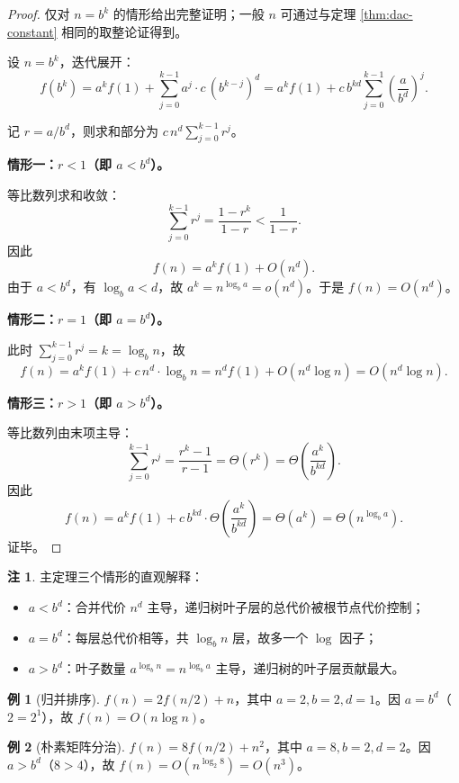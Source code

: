 \documentclass[UTF8,11pt,a4paper]{ctexbook}   %
\theoremstyle{definition}
\newtheorem{example}{例}[section]
\newtheorem{remark}{注}[section]
\begin{document}
\begin{proof}
仅对 $n=b^k$ 的情形给出完整证明；一般 $n$ 可通过与定理 \ref{thm:dac-constant} 相同的取整论证得到。

设 $n=b^k$，迭代展开：
\[
f(b^k) = a^k f(1) + \sum_{j=0}^{k-1} a^j \cdot c\,(b^{k-j})^d
= a^k f(1) + c\,b^{kd}\sum_{j=0}^{k-1}\left(\frac{a}{b^d}\right)^j.
\]

记 $r = a/b^d$，则求和部分为 $c\,n^d \sum_{j=0}^{k-1} r^j$。

\textbf{情形一：$r < 1$（即 $a < b^d$）。}

等比数列求和收敛：
\[
\sum_{j=0}^{k-1} r^j = \frac{1-r^k}{1-r} < \frac{1}{1-r}.
\]
因此
\[
f(n) = a^k f(1) + O(n^d).
\]
由于 $a < b^d$，有 $\log_b a < d$，故 $a^k = n^{\log_b a} = o(n^d)$。于是 $f(n) = O(n^d)$。

\textbf{情形二：$r = 1$（即 $a = b^d$）。}

此时 $\sum_{j=0}^{k-1} r^j = k = \log_b n$，故
\[
f(n) = a^k f(1) + c\,n^d\cdot\log_b n = n^d f(1) + O(n^d\log n) = O(n^d\log n).
\]

\textbf{情形三：$r > 1$（即 $a > b^d$）。}

等比数列由末项主导：
\[
\sum_{j=0}^{k-1} r^j = \frac{r^k - 1}{r-1} = \Theta(r^k) = \Theta\left(\frac{a^k}{b^{kd}}\right).
\]
因此
\[
f(n) = a^k f(1) + c\,b^{kd}\cdot\Theta\left(\frac{a^k}{b^{kd}}\right) = \Theta(a^k) = \Theta(n^{\log_b a}).
\]
证毕。
\end{proof}

\begin{remark}
主定理三个情形的直观解释：
\begin{itemize}
    \item $a < b^d$：合并代价 $n^d$ 主导，递归树叶子层的总代价被根节点代价控制；
    \item $a = b^d$：每层总代价相等，共 $\log_b n$ 层，故多一个 $\log$ 因子；
    \item $a > b^d$：叶子数量 $a^{\log_b n} = n^{\log_b a}$ 主导，递归树的叶子层贡献最大。
\end{itemize}
\end{remark}

\begin{example}[归并排序]
$f(n) = 2f(n/2) + n$，其中 $a=2,b=2,d=1$。因 $a=b^d$（$2=2^1$），故 $f(n) = O(n\log n)$。
\end{example}

\begin{example}[朴素矩阵分治]
$f(n) = 8f(n/2) + n^2$，其中 $a=8,b=2,d=2$。因 $a>b^d$（$8>4$），故 $f(n) = O(n^{\log_2 8}) = O(n^3)$。
\end{example}
\end{document}
